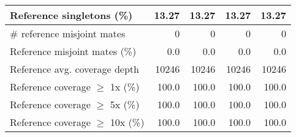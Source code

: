 \documentclass[12pt,a4paper]{article}
\begin{document}
\begin{table}[ht]
\begin{center}
\begin{tabular}{|l*{4}{|r}|}
Reference singletons (\%) & 13.27 & 13.27 & 13.27 & 13.27 \\ \hline
\# reference misjoint mates & 0 & 0 & 0 & 0 \\ \hline
Reference misjoint mates (\%) & 0.0 & 0.0 & 0.0 & 0.0 \\ \hline
Reference avg. coverage depth & 10246 & 10246 & 10246 & 10246 \\ \hline
Reference coverage $\geq$ 1x (\%) & 100.0 & 100.0 & 100.0 & 100.0 \\ \hline
Reference coverage $\geq$ 5x (\%) & 100.0 & 100.0 & 100.0 & 100.0 \\ \hline
Reference coverage $\geq$ 10x (\%) & 100.0 & 100.0 & 100.0 & 100.0 \\ \hline
\end{tabular}
\end{center}
\end{table}
\end{document}
